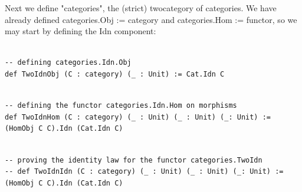\documentclass{book}
\newcounter{lcounter}
\begin{document}
Next we define "categories", the (strict) twocategory of categories. We have already defined categories.Obj := category and categories.Hom := functor, so we may start by defining the Idn component:\\

\begin{center}
\begin{tcolorbox}[width=5in,colback={white},title={\begin{center}\texttt{Lean \thelcounter} \addtocounter{lcounter}{1}  \end{center}},colbacktitle=Blue,coltitle=black]
\begin{verbatim}

-- defining categories.Idn.Obj
def TwoIdnObj (C : category) (_ : Unit) := Cat.Idn C

\end{verbatim}%
\end{tcolorbox}
\end{center}


\begin{center}
\begin{tcolorbox}[width=5in,colback={white},title={\begin{center}\texttt{Lean \thelcounter} \addtocounter{lcounter}{1}  \end{center}},colbacktitle=Blue,coltitle=black]
\begin{verbatim}

-- defining the functor categories.Idn.Hom on morphisms
def TwoIdnHom (C : category) (_ : Unit) (_ : Unit) (_: Unit) := (HomObj C C).Idn (Cat.Idn C)

\end{verbatim}%
\end{tcolorbox}
\end{center}


\begin{center}
\begin{tcolorbox}[width=5in,colback={white},title={\begin{center}\texttt{Lean \thelcounter} \addtocounter{lcounter}{1}  \end{center}},colbacktitle=Blue,coltitle=black]
\begin{verbatim}

-- proving the identity law for the functor categories.TwoIdn
-- def TwoIdnIdn (C : category) (_ : Unit) (_ : Unit) (_: Unit) := (HomObj C C).Idn (Cat.Idn C)

\end{verbatim}%
\end{tcolorbox}
\end{center}
\end{document}

